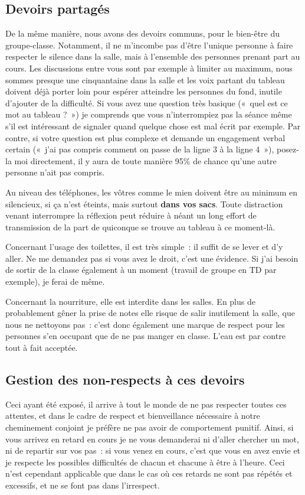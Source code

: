 \documentclass[a4paper, 10pt, final, garamond]{book}
\begin{document}
\subsection{Devoirs partagés}

De la même manière, nous avons des devoirs communs, pour le bien-être du
groupe-classe. Notamment, il ne m'incombe pas d'être l'unique personne à faire
respecter le silence dans la salle, mais à l'ensemble des personnes prenant part
au cours. Les discussions entre vous sont par exemple à limiter au maximum, nous
sommes presque une cinquantaine dans la salle et les voix partant du tableau
doivent déjà porter loin pour espérer atteindre les personnes du fond, inutile
d'ajouter de la difficulté. Si vous avez une question très basique («~quel est
ce mot au tableau ?~») je comprends que vous n'interrompiez pas la séance même
s'il est intéressant de signaler quand quelque chose est mal écrit par exemple.
Par contre, si votre question est plus complexe et demande un engagement verbal
certain («~j'ai pas compris comment on passe de la ligne 3 à la ligne 4~»),
posez-la moi directement, il y aura de toute manière 95\% de chance qu'une autre
personne n'ait pas compris.

Au niveau des téléphones, les vôtres comme le mien doivent être au minimum en
silencieux, si ça n'est éteints, mais surtout \textbf{dans vos sacs}. Toute
distraction venant interrompre la réflexion peut réduire à néant un long effort
de transmission de la part de quiconque se trouve au tableau à ce moment-là.

Concernant l'usage des toilettes, il est très simple~: il suffit de se lever et
d'y aller. Ne me demandez pas si vous avez le droit, c'est une évidence. Si j'ai
besoin de sortir de la classe également à un moment (travail de groupe en TD par
exemple), je ferai de même.

Concernant la nourriture, elle est interdite dans les salles. En plus de
probablement gêner la prise de notes elle risque de salir inutilement la
salle, que nous ne nettoyons pas~: c'est donc également une marque de respect
pour les personnes s'en occupant que de ne pas manger en classe. L'eau est par
contre tout à fait acceptée.

\subsection{Gestion des non-respects à ces devoirs}

Ceci ayant été exposé, il arrive à tout le monde de ne pas respecter toutes ces
attentes, et dans le cadre de respect et bienveillance nécessaire à notre
cheminement conjoint je préfère ne pas avoir de comportement punitif. Ainsi, si
vous arrivez en retard en cours je ne vous demanderai ni d'aller chercher un
mot, ni de repartir sur vos pas~: si vous venez en cours, c'est que vous en avez
envie et je respecte les possibles difficultés de chacun et chacune à être à
l'heure. Ceci n'est cependant applicable que dans le cas où ces retards ne sont
pas répétés et excessifs, et ne se font pas dans l'irrespect.
\end{document}
